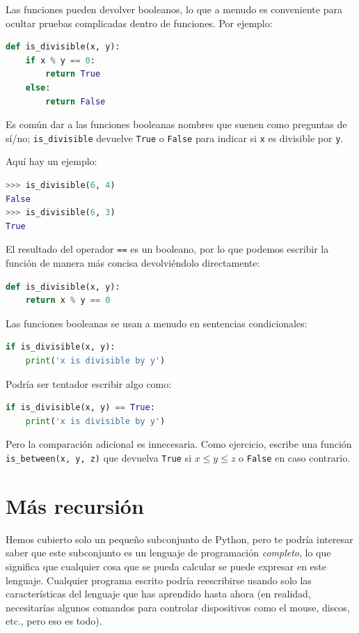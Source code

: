 Las funciones pueden devolver booleanos, lo que a menudo es conveniente para ocultar pruebas complicadas dentro de funciones. Por ejemplo:

\begin{lstlisting}[language=Python]
def is_divisible(x, y):
    if x % y == 0:
        return True
    else:
        return False
\end{lstlisting}

Es común dar a las funciones booleanas nombres que suenen como preguntas de sí/no; \texttt{is\_divisible} devuelve \texttt{True} o \texttt{False} para indicar si \texttt{x} es divisible por \texttt{y}.

Aquí hay un ejemplo:

\begin{lstlisting}[language=Python]
>>> is_divisible(6, 4)
False
>>> is_divisible(6, 3)
True
\end{lstlisting}

El resultado del operador \texttt{==} es un booleano, por lo que podemos escribir la función de manera más concisa devolviéndolo directamente:

\begin{lstlisting}[language=Python]
def is_divisible(x, y):
    return x % y == 0
\end{lstlisting}

Las funciones booleanas se usan a menudo en sentencias condicionales:

\begin{lstlisting}[language=Python]
if is_divisible(x, y):
    print('x is divisible by y')
\end{lstlisting}

Podría ser tentador escribir algo como:

\begin{lstlisting}[language=Python]
if is_divisible(x, y) == True:
    print('x is divisible by y')
\end{lstlisting}

Pero la comparación adicional es innecesaria. Como ejercicio, escribe una función \texttt{is\_between(x, y, z)} que devuelva \texttt{True} si $x \leq y \leq z$ o \texttt{False} en caso contrario.

\section{Más recursión}

Hemos cubierto solo un pequeño subconjunto de Python, pero te podría interesar saber que este subconjunto es un lenguaje de programación \textit{completo}, lo que significa que cualquier cosa que se pueda calcular se puede expresar en este lenguaje. Cualquier programa escrito podría reescribirse usando solo las características del lenguaje que has aprendido hasta ahora (en realidad, necesitarías algunos comandos para controlar dispositivos como el mouse, discos, etc., pero eso es todo).

